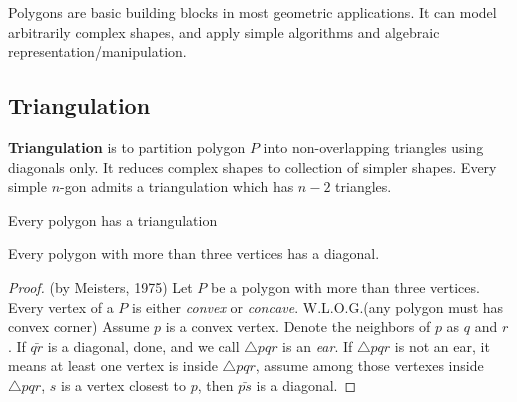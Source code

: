 					\begin{figure}[h!]
						\centering
					\end{figure}

					Polygons are basic building blocks in most geometric applications. It can model arbitrarily complex shapes, and apply simple algorithms and algebraic representation/manipulation.

				\subsection{Triangulation}
					\begin{definition}[Triangulation]
						\textbf{Triangulation} is to partition polygon $P$ into non-overlapping triangles using diagonals only. It reduces complex shapes to collection of simpler shapes. Every simple $n$-gon admits a triangulation which has $n-2$ triangles.				
					\end{definition}

					\begin{figure}[h!]
						\centering
					\end{figure}

					\begin{theorem}
						Every polygon has a triangulation				
					\end{theorem}

					\begin{lemma}
						Every polygon with more than three vertices has a diagonal.
					\end{lemma}

					\begin{proof}
						(by Meisters, 1975) Let $P$ be a polygon with more than three vertices. Every vertex of a $P$ is either \textit{convex} or \textit{concave}. W.L.O.G.(any polygon must has convex corner) Assume $p$ is a convex vertex. Denote the neighbors of $p$ as $q$ and $r$. If $\bar{qr}$ is a diagonal, done, and we call $\triangle{pqr}$ is an \textit{ear}. If $\triangle{pqr}$ is not an ear, it means at least one vertex is inside $\triangle{pqr}$, assume among those vertexes inside $\triangle{pqr}$, $s$ is a vertex closest to $p$, then $\bar{ps}$ is a diagonal.
					\end{proof}

